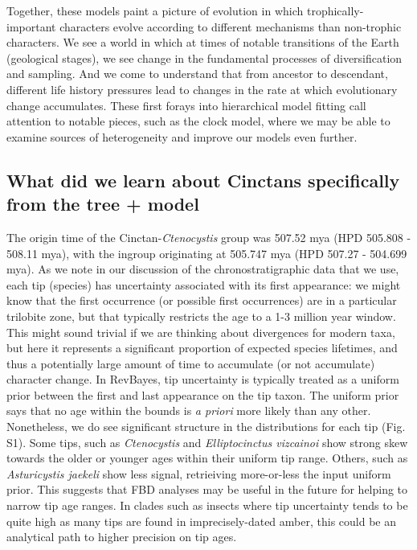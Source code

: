 \documentclass{article}
\begin{document}
Together, these models paint a picture of evolution in which trophically-important characters evolve according to different mechanisms than non-trophic characters.
We see a world in which at times of notable transitions of the Earth (geological stages), we see change in the fundamental processes of diversification and sampling.
And we come to understand that from ancestor to descendant, different life history pressures lead to changes in the rate at which evolutionary change accumulates. 
These first forays into hierarchical model fitting call attention to notable pieces, such as the clock model, where we may be able to examine sources of heterogeneity and improve our models even further.

\subsection{What did we learn about Cinctans specifically from the tree + model}

The origin time of the Cinctan-\textit{Ctenocystis} group was 507.52 mya (HPD 505.808 - 508.11 mya), with the ingroup originating at 505.747 mya (HPD 507.27 - 504.699 mya).
As we note in our discussion of the chronostratigraphic data that we use, each tip (species) has uncertainty associated with its first appearance: we might know that the first occurrence (or possible first occurrences) are in a particular trilobite zone, but that typically restricts the age to a 1-3 million year window.  This might sound trivial if we are thinking about divergences for modern taxa, but here it represents a significant proportion of expected species lifetimes, and thus a potentially large amount of time to accumulate (or not accumulate) character change.
In RevBayes, tip uncertainty is typically treated as a uniform prior between the first and last appearance on the tip taxon.
The uniform prior says that no age within the bounds is \textit{a priori} more likely than any other.
Nonetheless, we do see significant structure in the distributions for each tip (Fig. S1). 
Some tips, such as \textit{Ctenocystis} and \textit{Elliptocinctus vizcainoi} show strong skew towards the older or younger ages within their uniform tip range.
Others, such as \textit{Asturicystis jaekeli} show less signal, retrieiving more-or-less the input uniform prior.
This suggests that FBD analyses may be useful in the future for helping to narrow tip age ranges.
In clades such as insects where tip uncertainty tends to be quite high as many tips are found in imprecisely-dated amber, this could be an analytical path to higher precision on tip ages.
\end{document}
